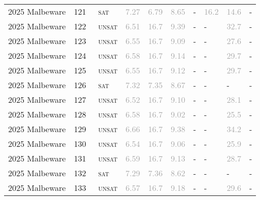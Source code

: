 \begin{center}
{\begin{longtable}{@{}llllllllll@{}}
2025 Malbeware & 121 & ~\textsc{sat} & \textcolor{darkgray}{7.27} & \textcolor{darkgray}{6.79} & \textcolor{darkgray}{8.65} & - & \textcolor{darkgray}{16.2} & \textcolor{darkgray}{14.6} & - \\
2025 Malbeware & 122 & ~\textsc{unsat} & \textcolor{darkgray}{6.51} & \textcolor{darkgray}{16.7} & \textcolor{darkgray}{9.39} & - & - & \textcolor{darkgray}{32.7} & - \\
2025 Malbeware & 123 & ~\textsc{unsat} & \textcolor{darkgray}{6.55} & \textcolor{darkgray}{16.7} & \textcolor{darkgray}{9.09} & - & - & \textcolor{darkgray}{27.6} & - \\
2025 Malbeware & 124 & ~\textsc{unsat} & \textcolor{darkgray}{6.58} & \textcolor{darkgray}{16.7} & \textcolor{darkgray}{9.14} & - & - & \textcolor{darkgray}{29.7} & - \\
2025 Malbeware & 125 & ~\textsc{unsat} & \textcolor{darkgray}{6.55} & \textcolor{darkgray}{16.7} & \textcolor{darkgray}{9.12} & - & - & \textcolor{darkgray}{29.7} & - \\
2025 Malbeware & 126 & ~\textsc{sat} & \textcolor{darkgray}{7.32} & \textcolor{darkgray}{7.35} & \textcolor{darkgray}{8.67} & - & - & - & - \\
2025 Malbeware & 127 & ~\textsc{unsat} & \textcolor{darkgray}{6.52} & \textcolor{darkgray}{16.7} & \textcolor{darkgray}{9.10} & - & - & \textcolor{darkgray}{28.1} & - \\
2025 Malbeware & 128 & ~\textsc{unsat} & \textcolor{darkgray}{6.58} & \textcolor{darkgray}{16.7} & \textcolor{darkgray}{9.02} & - & - & \textcolor{darkgray}{25.5} & - \\
2025 Malbeware & 129 & ~\textsc{unsat} & \textcolor{darkgray}{6.66} & \textcolor{darkgray}{16.7} & \textcolor{darkgray}{9.38} & - & - & \textcolor{darkgray}{34.2} & - \\
2025 Malbeware & 130 & ~\textsc{unsat} & \textcolor{darkgray}{6.54} & \textcolor{darkgray}{16.7} & \textcolor{darkgray}{9.06} & - & - & \textcolor{darkgray}{25.9} & - \\
2025 Malbeware & 131 & ~\textsc{unsat} & \textcolor{darkgray}{6.59} & \textcolor{darkgray}{16.7} & \textcolor{darkgray}{9.13} & - & - & \textcolor{darkgray}{28.7} & - \\
2025 Malbeware & 132 & ~\textsc{sat} & \textcolor{darkgray}{7.29} & \textcolor{darkgray}{7.36} & \textcolor{darkgray}{8.62} & - & - & - & - \\
2025 Malbeware & 133 & ~\textsc{unsat} & \textcolor{darkgray}{6.57} & \textcolor{darkgray}{16.7} & \textcolor{darkgray}{9.18} & - & - & \textcolor{darkgray}{29.6} & - \\

\end{longtable}}
\end{center}
